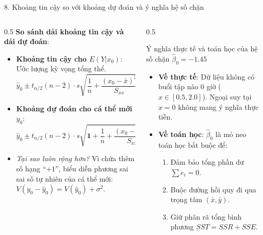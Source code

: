 \documentclass[aspectratio=169, 10pt]{beamer}
\begin{document}
\begin{frame}{8. Khoảng tin cậy so với khoảng dự đoán và ý nghĩa hệ số chặn}
    \begin{columns}
        \begin{column}{0.5\textwidth}
            \textbf{So sánh dải khoảng tin cậy và dải dự đoán}:
            \begin{itemize}
                \item \textbf{Khoảng tin cậy cho $E(Y|x_0)$}: Ước lượng kỳ vọng tổng thể.
                \[ \hat{y}_0 \pm t_{\alpha/2}(n-2) \cdot s \sqrt{\frac{1}{n} + \frac{(x_0 - \bar{x})^2}{S_{xx}}} \]
                \item \textbf{Khoảng dự đoán cho cá thể mới $y_0$}:
                \[ \hat{y}_0 \pm t_{\alpha/2}(n-2) \cdot s \sqrt{\mathbf{1} + \frac{1}{n} + \frac{(x_0 - \bar{x})^2}{S_{xx}}} \]
                \item \textit{Tại sao luôn rộng hơn?} Vì chứa thêm số hạng ``$+1$'', biểu diễn phương sai sai số tự nhiên của cá thể mới: $V(y_0 - \hat{y}_0) = V(\hat{y}_0) + \sigma^2$.
            \end{itemize}
        \end{column}
        \begin{column}{0.5\textwidth}
            \begin{block}{Ý nghĩa thực tế và toán học của hệ số chặn $\hat{\beta}_0 = -1.45$}
                \begin{itemize}
                    \item \textbf{Về thực tế}: Dữ liệu không có buổi tập nào $0$ giờ ($x \in [0.5, 2.0]$). Ngoại suy tại $x=0$ không mang ý nghĩa thực tiễn.
                    \item \textbf{Về toán học}: $\hat{\beta}_0$ là mỏ neo toán học bắt buộc để:
                    \begin{enumerate}
                        \item Đảm bảo tổng phần dư $\sum e_i = 0$.
                        \item Buộc đường hồi quy đi qua trọng tâm $(\bar{x}, \bar{y})$.
                        \item Giữ phân rã tổng bình phương $SST = SSR + SSE$.
                    \end{enumerate}
                \end{itemize}
            \end{block}
        \end{column}
    \end{columns}
\end{frame}
\end{document}
